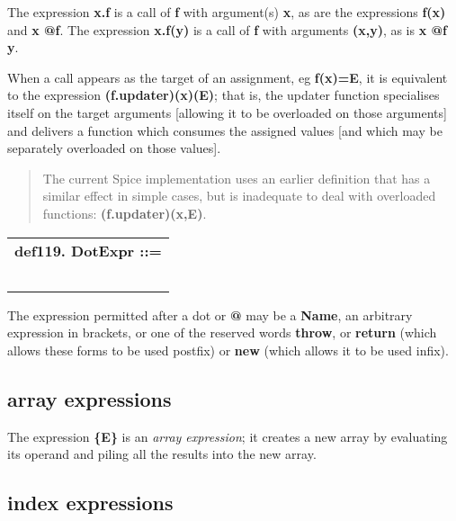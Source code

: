 \documentclass{report}
\begin{document}
The expression {\bf x.f} is a call of {\bf f} with argument(s) {\bf x}, as are the
expressions {\bf f(x)} and {\bf x @f}. The expression {\bf x.f(y)} is a call of
{\bf f} with arguments {\bf (x,y)}, as is {\bf x @f y}.

When a call appears as the target of an assignment, eg {\bf f(x)=E}, it is
equivalent to the expression {\bf (f.updater)(x)(E)}; that is, the updater
function specialises itself on the target arguments {[}allowing it to
be overloaded on those arguments{]} and delivers a function which consumes
the assigned values {[}and which may be separately overloaded on those values{]}.

\begin{quote}The current Spice implementation uses an earlier definition that has
a similar effect in simple cases, but is inadequate to deal with
overloaded functions: {\bf (f.updater)(x,E)}.\end{quote}\begin{tabular}{l}
{\bf def119. DotExpr ::= }\\ 
\hspace*{3mm}{\tt Name} \\ 
\hspace*{3mm}{\tt  $\mid$ "(" Expr ")"} \\ 
\hspace*{3mm}{\tt  $\mid$ "return"} \\ 
\hspace*{3mm}{\tt  $\mid$ "throw"} \\ 
\hspace*{3mm}{\tt  $\mid$ "new"} \\ 
\end{tabular}

The expression permitted after a dot or {\bf @} may be a {\bf Name}, an arbitrary
expression in brackets, or one of the reserved words {\bf throw}, or
{\bf return} (which allows these forms to be used postfix) or {\bf new} (which
allows it to be used infix).\subsection{array expressions}


The expression {\bf \{E\}} is an {\em array expression}; it creates a new array
by evaluating its operand and piling all the results into the new
array.\subsection{index expressions}
\end{document}
